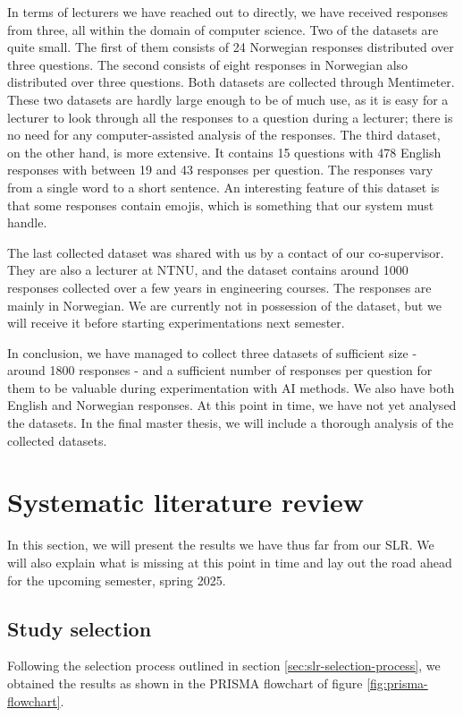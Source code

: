 In terms of lecturers we have reached out to directly, we have received responses from three, all within the domain of computer science. Two of the datasets are quite small. The first of them consists of 24 Norwegian responses distributed over three questions. The second consists of eight responses in Norwegian also distributed over three questions. Both datasets are collected through Mentimeter. These two datasets are hardly large enough to be of much use, as it is easy for a lecturer to look through all the responses to a question during a lecturer; there is no need for any computer-assisted analysis of the responses. The third dataset, on the other hand, is more extensive. It contains 15 questions with 478 English responses with between 19 and 43 responses per question. The responses vary from a single word to a short sentence. An interesting feature of this dataset is that some responses contain emojis, which is something that our system must handle.

The last collected dataset was shared with us by a contact of our co-supervisor. They are also a lecturer at NTNU, and the dataset contains around 1000 responses collected over a few years in engineering courses. The responses are mainly in Norwegian. We are currently not in possession of the dataset, but we will receive it before starting experimentations next semester.

In conclusion, we have managed to collect three datasets of sufficient size - around 1800 responses - and a sufficient number of responses per question for them to be valuable during experimentation with AI methods. We also have both English and Norwegian responses. At this point in time, we have not yet analysed the datasets. In the final master thesis, we will include a thorough analysis of the collected datasets.

\section{Systematic literature review}\label{sec:results-slr}
In this section, we will present the results we have thus far from our SLR. We will also explain what is missing at this point in time and lay out the road ahead for the upcoming semester, spring 2025.

\subsection{Study selection}
Following the selection process outlined in section \ref{sec:slr-selection-process}, we obtained the results as shown in the PRISMA flowchart of figure \ref{fig:prisma-flowchart}.

